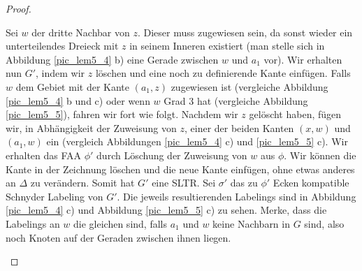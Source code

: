 \begin{proof}
\begin{description}[leftmargin =0pt, font = \rmfamily ]
Sei $w$ der dritte Nachbar von $z$. Dieser muss zugewiesen sein, da sonst wieder ein unterteilendes Dreieck mit $z$ in seinem Inneren existiert (man stelle sich in Abbildung \ref{pic_lem5_4} b) eine Gerade zwischen $w$ und $a_1$ vor). Wir erhalten nun $G'$, indem wir $z$ löschen und eine noch zu definierende Kante einfügen. Falls $w$ dem Gebiet mit der Kante $(a_1,z)$ zugewiesen ist (vergleiche Abbildung \ref{pic_lem5_4} b und c) oder wenn $w$ Grad 3 hat (vergleiche Abbildung \ref{pic_lem5_5}), fahren wir fort wie folgt. Nachdem wir $z$ gelöscht haben, fügen wir, in Abhängigkeit der Zuweisung von $z$, einer der beiden Kanten $(x,w)$ und $(a_1,w)$ ein (vergleich Abbildungen \ref{pic_lem5_4} c) und \ref{pic_lem5_5} c). Wir erhalten das FAA $\phi'$ durch Löschung der Zuweisung von $w$ aus $\phi$. Wir können die Kante in der Zeichnung löschen und die neue Kante einfügen, ohne etwas anderes an $\Delta$ zu verändern. Somit hat $G'$ eine SLTR. Sei $\sigma'$ das zu $\phi'$ Ecken kompatible Schnyder Labeling von $G'$. Die jeweils resultierenden Labelings sind in Abbildung \ref{pic_lem5_4} c) und Abbildung \ref{pic_lem5_5} c) zu sehen. Merke, dass die Labelings an $w$ die gleichen sind, falls $a_1$ und $w$ keine Nachbarn in $G$ sind, also noch Knoten auf der Geraden zwischen ihnen liegen.


\end{description}
\end{proof}
